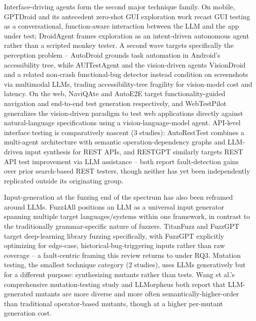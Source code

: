 Interface-driving agents form the second major technique family. On
mobile, GPTDroid \cite{liu2024} and its antecedent zero-shot GUI
exploration work \cite{liu2023} recast GUI testing as a conversational,
function-aware interaction between the LLM and the app under test;
DroidAgent \cite{yoon2023} frames exploration as an intent-driven
autonomous agent rather than a scripted monkey tester. A second wave
targets specifically the perception problem -- AutoDroid
\cite{slr0332024} grounds task automation in Android's accessibility
tree, while AUITestAgent \cite{slr0342024} and the vision-driven
agents VisionDroid \cite{slr0352024} and a related non-crash
functional-bug detector \cite{slr0362026} instead condition on
screenshots via multimodal LLMs, trading accessibility-tree fragility
for vision-model cost and latency. On the web, NaviQAte
\cite{shahbandeh2024} and AutoE2E \cite{alian2024} target
functionality-guided navigation and end-to-end test generation
respectively, and WebTestPilot \cite{g62026} generalizes the
vision-driven paradigm to test web applications directly against
natural-language specifications using a vision-language-model agent.
API-level interface testing is comparatively nascent (3 studies):
AutoRestTest \cite{stennett2025,same2025} combines a multi-agent
architecture with semantic operation-dependency graphs and
LLM-driven input synthesis for REST APIs, and RESTGPT
\cite{kim2024} similarly targets REST API test improvement via LLM
assistance -- both report fault-detection gains over prior
search-based REST testers, though neither has yet been independently
replicated outside its originating group.

Input-generation at the fuzzing end of the spectrum has also been
reframed around LLMs. Fuzz4All \cite{xia2024} positions an LLM as a
universal input generator spanning multiple target languages/systems
within one framework, in contrast to the traditionally
grammar-specific nature of fuzzers. TitanFuzz \cite{deng2023} and
FuzzGPT \cite{deng2023b} target deep-learning library fuzzing
specifically, with FuzzGPT explicitly optimizing for edge-case,
historical-bug-triggering inputs rather than raw coverage -- a
fault-centric framing this review returns to under RQ3. Mutation
testing, the smallest technique category (2 studies), uses LLMs
generatively but for a different purpose: synthesizing mutants rather
than tests. Wang et al.'s comprehensive mutation-testing study
\cite{wang2024} and LLMorpheus \cite{tip2024} both report that
LLM-generated mutants are more diverse and more often
semantically-higher-order than traditional operator-based mutants,
though at a higher per-mutant generation cost.


